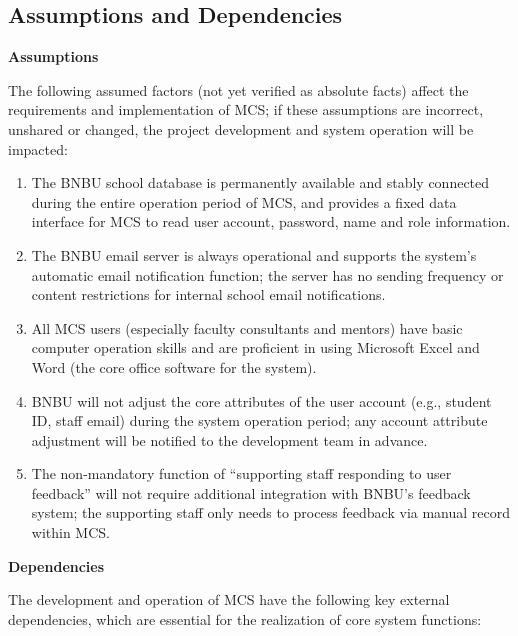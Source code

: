 \subsection{Assumptions and Dependencies}

\textbf{Assumptions}

The following assumed factors (not yet verified as absolute facts) affect the requirements and implementation of MCS; if these assumptions are incorrect, unshared or changed, the project development and system operation will be impacted:

\begin{enumerate}
\item The BNBU school database is permanently available and stably connected during the entire operation period of MCS, and provides a fixed data interface for MCS to read user account, password, name and role information.
\item The BNBU email server is always operational and supports the system's automatic email notification function; the server has no sending frequency or content restrictions for internal school email notifications.
\item All MCS users (especially faculty consultants and mentors) have basic computer operation skills and are proficient in using Microsoft Excel and Word (the core office software for the system).
\item BNBU will not adjust the core attributes of the user account (e.g., student ID, staff email) during the system operation period; any account attribute adjustment will be notified to the development team in advance.
\item The non-mandatory function of ``supporting staff responding to user feedback'' will not require additional integration with BNBU's feedback system; the supporting staff only needs to process feedback via manual record within MCS.
\end{enumerate}

\textbf{Dependencies}

The development and operation of MCS have the following key external dependencies, which are essential for the realization of core system functions:

